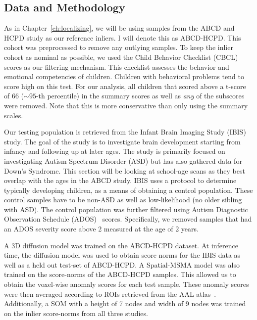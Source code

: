 


\subsection*{Data and Methodology}
 
As in Chapter~\ref{ch:localizing}, we will be using samples from the ABCD and HCPD study as our reference inliers. I will denote this as ABCD-HCPD. This cohort was preprocessed to remove any outlying samples. To keep the inlier cohort as nominal as possible, we used the Child Behavior Checklist (CBCL)~\cite{achenbachChildBehaviorChecklist1999} scores as our filtering mechanism. This checklist assesses the behavior and emotional competencies of children. Children with behavioral problems tend to score high on this test. For our analysis, all children that scored above a t-score of 66 ($\sim 95$-th percentile) in the summary scores as well as \textit{any} of the subscores were removed. Note that this is more conservative than only using the summary scales.

Our testing population is retrieved from the Infant Brain Imaging Study (IBIS) study. The goal of the study is to investigate brain development starting from infancy and following up at later ages. The study is primarily focused on investigating Autism Spectrum Disorder (ASD) but has also gathered data for Down's Syndrome. This section will be looking at school-age scans as they best overlap with the ages in the ABCD study. IBIS uses a protocol to determine typically developing children, as a means of obtaining a control population. These control samples have to be non-ASD as well as low-likelihood (no older sibling with ASD). The control population was further filtered using Autism Diagnostic Observation Schedule (ADOS)~\cite{lord2012autism} scores. Specifically, we removed samples that had an ADOS severity score above 2 measured at the age of 2 years.

A 3D diffusion model was trained on the ABCD-HCPD dataset. At inference time, the diffusion model was used to obtain score norms for the IBIS data as well as a held out test-set of ABCD-HCPD. A Spatial-MSMA model was also trained on the score-norms of the ABCD-HCPD samples. This allowed us to obtain the voxel-wise anomaly scores for each test sample. These anomaly scores were then averaged according to ROIs retrieved from the AAL atlas~\cite{ROLLS2020116189}. Additionally, a SOM with a height of 7 nodes and width of 9 nodes was trained on the inlier score-norms from all three studies. 


